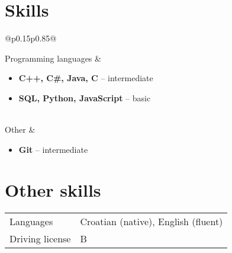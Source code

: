 \documentclass[a4paper]{article}
\makeatletter
\newlength{\tablewidth}
\newenvironment{skills}{%
\setlength{\tablewidth}{\linewidth}
\addtolength{\tablewidth}{-2\tabcolsep}
\begin{tabular}{@{}p{0.15\tablewidth}p{0.85\tablewidth}@{}}
}{%
\end{tabular}
}
\makeatother
\begin{document}
\section{Skills}
\begin{skills}
	Programming languages &
	\begin{itemize}
		\item \textbf{C++, C\#, Java, C} -- intermediate
		\item \textbf{SQL, Python, JavaScript} -- basic
	\end{itemize} \\
	Other &
	\begin{itemize}
		\item \textbf{Git} -- intermediate
	\end{itemize}
\end{skills}

\section{Other skills}
\begin{skills}
    Languages & Croatian (native), English (fluent) \\
    Driving license & B \\
\end{skills}
\end{document}
